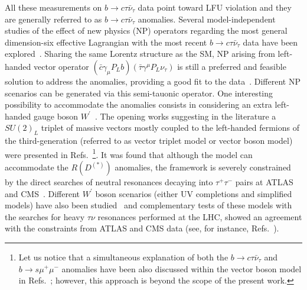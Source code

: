 \documentclass[reprint,showpacs,aps,prd,nofootinbib,superscriptaddress,longbibliography]{revtex4-1}
\begin{document}
All these measurements on $b \to c\tau\bar{\nu}_\tau$ data point toward LFU violation and they are generally referred to as $b \to c\tau\bar{\nu}_\tau$ anomalies. Several model-independent studies of the effect of new physics (NP) operators regarding the most general dimension-six effective Lagrangian with the most recent $b \rightarrow c \tau \bar{\nu}_{\tau}$ data have been  explored~\cite{Iguro:2020keo,Iguro:2020cpg,Asadi:2019xrc,Murgui:2019czp,Mandal:2020htr,Cheung:2020sbq,Sahoo:2019hbu,Shi:2019gxi,
Bardhan:2019ljo,Blanke:2018yud,Blanke:2019qrx,Alok:2019uqc,Huang:2018nnq,Jung:2018lfu,Kumbhakar:2020jdz,
Angelescu:2018tyl,Feruglio:2018fxo,Iguro:2018vqb}. Sharing the same Lorentz structure as the SM, NP arising from left-handed vector operator $(\bar{c}\gamma_\mu P_L b)(\bar{\tau}\gamma^\mu P_L \nu_\tau)$ is still a preferred and feasible solution to address the anomalies, providing a good fit to the data~\cite{Iguro:2020keo,Iguro:2020cpg,Asadi:2019xrc,Murgui:2019czp,Mandal:2020htr,Cheung:2020sbq,Sahoo:2019hbu,Shi:2019gxi,
Bardhan:2019ljo,Blanke:2018yud,Blanke:2019qrx,Alok:2019uqc,Huang:2018nnq,Jung:2018lfu,Kumbhakar:2020jdz,
Angelescu:2018tyl,Feruglio:2018fxo,Iguro:2018vqb}. Different NP scenarios can be generated via this semi-tauonic operator. 
One interesting possibility to accommodate the anomalies consists in considering an extra left-handed gauge boson $W^\prime$~\cite{Bhattacharya:2014wla,Greljo:2015mma,Faroughy:2016osc,Abdullah:2018ets,Greljo:2018tzh,
Dasgupta:2018nzt, Boucenna:2016qad,Boucenna:2016wpr,Buttazzo:2017ixm,Bhattacharya:2016mcc,Kumar:2018kmr,
Gomez:2019xfw,Iguro:2018fni}. 
The opening works suggesting in the literature a $SU(2)_L$ triplet of massive vectors mostly coupled to the left-handed fermions of the third-generation (referred to as vector triplet model or vector boson model) were presented in Refs.~\cite{Bhattacharya:2014wla,Greljo:2015mma,Faroughy:2016osc}\footnote{Let us notice that a simultaneous explanation of both the $b \to c\tau\bar{\nu}_\tau$ and $b \to s\mu^+\mu^-$ anomalies have been also discussed within the vector boson model in Refs.~\cite{Bhattacharya:2014wla,Greljo:2015mma,Bhattacharya:2016mcc,Kumar:2018kmr}; however, this approach is beyond the scope of the present work.}. It was found that although the model can accommodate the $R(D^{(\ast)})$ anomalies, the framework is severely constrained by the direct  searches of neutral resonances decaying into $\tau^+ \tau^-$ pairs at ATLAS and CMS~\cite{Greljo:2015mma,Faroughy:2016osc}. Different $W^\prime$ boson scenarios (either UV completions and simplified models) have also been studied~\cite{Abdullah:2018ets,Greljo:2018tzh,
Dasgupta:2018nzt, Boucenna:2016qad,Boucenna:2016wpr,Buttazzo:2017ixm,Bhattacharya:2016mcc,Kumar:2018kmr,
Gomez:2019xfw,Iguro:2018fni} and complementary tests of these models with the searches for heavy $\tau\nu$ resonances performed at the LHC, showed an agreement with the constraints from ATLAS and CMS data (see, for instance, Refs.~\cite{Iguro:2018fni,Abdullah:2018ets,Greljo:2018tzh,Marzocca:2020ueu}). 
\end{document}
